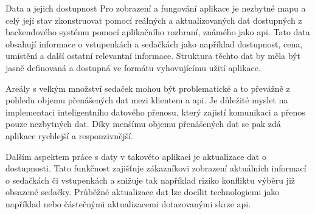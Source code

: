 \begin{subsection}{Data a jejich dostupnost}
    \label{subsec:identifikace-interaktivni-mapa-data-a-dostupnost}
    Pro zobrazení a fungování aplikace je nezbytné mapu a celý její stav zkonstruovat pomocí reálných a aktualizovaných dat dostupných z backendového systému pomocí aplikačního rozhraní, známého jako \ac{api}.
    Tato data obsahují informace o vstupenkách a sedačkách jako například dostupnost, cena, umístění a další ostatní relevantní informace.
    Struktura těchto dat by měla být jasně definovaná a dostupná ve formátu vyhovujícímu užití aplikace.

    Areály s velkým množství sedaček mohou být problematické a to převážně z pohledu objemu přenášených dat mezi klientem a \ac{api}.
    Je důležité myslet na implementaci inteligentního datového přenosu, který zajistí komunikaci a přenos pouze nezbytných dat.
    Díky menšímu objemu přenášených dat se pak zdá aplikace rychlejší a responzivnější.

    Dalším aspektem práce s daty v takovéto aplikaci je aktualizace dat o dostupnosti.
    Tato funkčnost zajišťuje zákazníkovi zobrazení aktuálních informací o sedačkách či vstupenkách a snižuje tak například riziko konfliktu výběru již obsazené sedačky.
    Průběžné aktualizace dat lze docílit technologiemi jako například  nebo částečnými aktualizacemi dotazovanými skrze \ac{api}.
\end{subsection}
